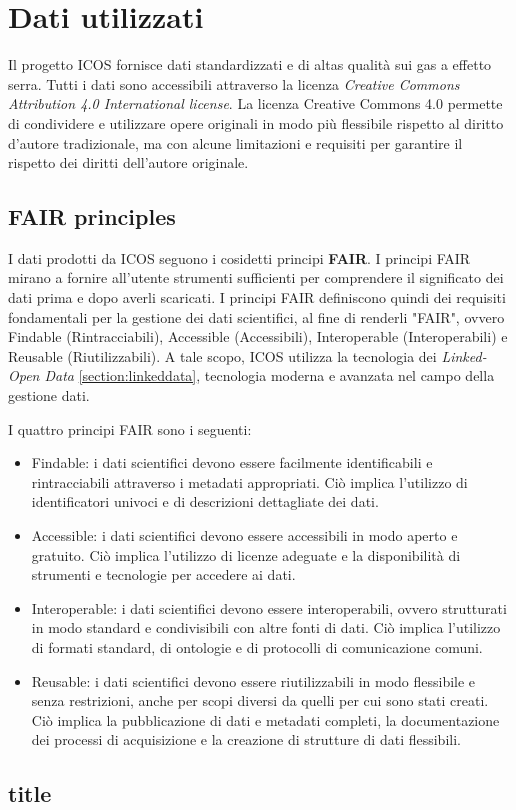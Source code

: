 \chapter{Dati utilizzati}
\label{chap:dati}

Il progetto ICOS fornisce dati standardizzati e di altas qualità sui gas a effetto serra.
Tutti i dati sono accessibili attraverso la licenza \textit{Creative Commons Attribution 4.0 International license}.
La licenza Creative Commons 4.0 permette di condividere e utilizzare opere originali in modo più flessibile rispetto
al diritto d'autore tradizionale, ma con alcune limitazioni e requisiti per garantire il rispetto dei diritti dell'autore originale.

\section{FAIR principles}
\label{section:fair}
I dati prodotti da ICOS seguono i cosidetti principi \textbf{FAIR}.
I principi FAIR mirano a fornire all'utente strumenti sufficienti per 
comprendere il significato dei dati prima e dopo averli scaricati. 
I principi FAIR definiscono quindi dei requisiti fondamentali per
la gestione dei dati scientifici, al fine di renderli "FAIR",
ovvero Findable (Rintracciabili), Accessible (Accessibili), Interoperable (Interoperabili) e 
Reusable (Riutilizzabili). A tale scopo, ICOS utilizza la tecnologia dei \textit{Linked-Open Data} \ref{section:linkeddata},
tecnologia moderna e avanzata nel campo della gestione dati. 

I quattro principi FAIR sono i seguenti:

\begin{itemize}
    \item Findable: i dati scientifici devono essere facilmente identificabili e rintracciabili attraverso i metadati appropriati.
    Ciò implica l'utilizzo di identificatori univoci e di descrizioni dettagliate dei dati.
    \item Accessible: i dati scientifici devono essere accessibili in modo aperto e gratuito.
    Ciò implica l'utilizzo di licenze adeguate e la disponibilità di strumenti e tecnologie per accedere ai dati.
    \item Interoperable: i dati scientifici devono essere interoperabili, ovvero strutturati in modo standard
    e condivisibili con altre fonti di dati. Ciò implica l'utilizzo di formati standard, di ontologie e di protocolli
    di comunicazione comuni.
    \item Reusable: i dati scientifici devono essere riutilizzabili
    in modo flessibile e senza restrizioni, anche per scopi diversi da quelli
    per cui sono stati creati. Ciò implica la pubblicazione di dati e metadati completi,
    la documentazione dei processi di acquisizione e la creazione di strutture di dati flessibili.
\end{itemize}


\section{title}
